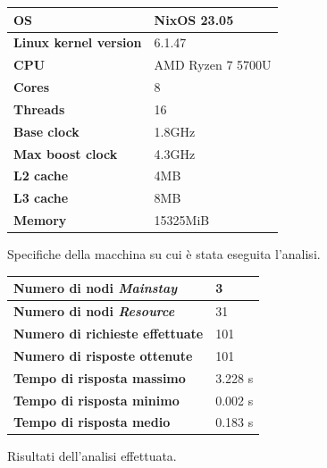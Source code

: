 \documentclass[12pt]{article}
\begin{document}
\begin{figure}[H]
    \caption{Specifiche della macchina su cui è stata eseguita l'analisi.}
    \begin{center}
        \begin{tabular}{ | l | l | }
            \hline
            \textbf{OS} & NixOS 23.05 \\ 
            \hline
            \textbf{Linux kernel version} & 6.1.47 \\ 
            \hline
            \textbf{CPU} & AMD Ryzen 7 5700U \\
            \hline
            \textbf{Cores} & 8 \\
            \hline
            \textbf{Threads} & 16 \\
            \hline
            \textbf{Base clock} & 1.8GHz \\
            \hline
            \textbf{Max boost clock} & 4.3GHz \\
            \hline
            \textbf{L2 cache} & 4MB \\
            \hline
            \textbf{L3 cache} & 8MB \\
            \hline
            \textbf{Memory} & 15325MiB \\
            \hline
        \end{tabular}
    \end{center}
    \label{tab:machine-specs}
\end{figure}

\begin{figure}[H]
    \caption{Risultati dell'analisi effettuata.}
    \begin{center}
        \begin{tabular}{ | l | l | }
            \hline
            \textbf{Numero di nodi \textit{Mainstay}} & 3 \\ 
            \hline
            \textbf{Numero di nodi \textit{Resource}} & 31 \\ 
            \hline
            \textbf{Numero di richieste effettuate} & 101 \\
            \hline
            \textbf{Numero di risposte ottenute} & 101 \\
            \hline
            \textbf{Tempo di risposta massimo} & 3.228 s \\
            \hline
            \textbf{Tempo di risposta minimo} & 0.002 s \\
            \hline
            \textbf{Tempo di risposta medio} & 0.183 s \\
            \hline
        \end{tabular}
    \end{center}
    \label{tab:analysis-specs}
\end{figure}
\end{document}
